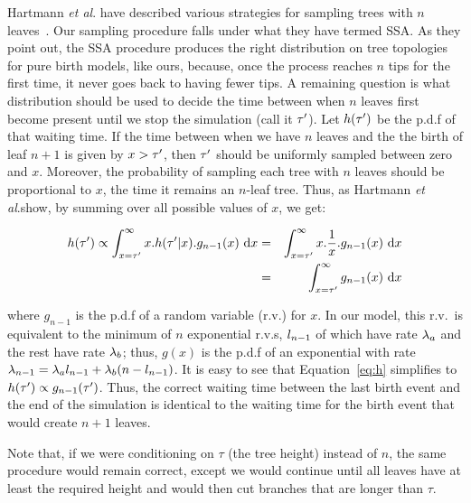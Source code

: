 Hartmann \textit{et al}. have described various strategies for sampling trees with $n$ leaves~\cite{Hartmann2010}. Our sampling procedure falls under what they have termed \gls{SSA}. As they point out, the \gls{SSA} procedure produces the right distribution on tree topologies for pure birth models, like ours, because, once the process reaches $n$ tips for the first time, it never goes back to having fewer tips. A remaining question is what distribution should be used to decide the time between when $n$ leaves first become present until we stop the simulation (call it $\tau'$). Let $h(\tau')$ be the p.d.f of that waiting time. If the time between when we have $n$ leaves and the the birth of leaf $n+1$ is given by $x>\tau'$, then $\tau'$ should be uniformly sampled between zero and $x$. Moreover, the probability of sampling each tree with $n$ leaves should be proportional to $x$, the time it remains an $n$-leaf tree. Thus, as Hartmann \textit{et al}.show, by summing over all possible values of $x$, we get:
\begin{small}
\begin{eqnarray}\label{eq:h}
h(\tav) \propto \int_{x=\tav}^{\infty} x.h(\tav|x).g_{n-1}(x) \ \mathrm{d}x &=& \int_{x=\tav}^{\infty} x.\frac{1}{x}.g_{n-1}(x) \ \mathrm{d}x  \nonumber \\ 
&=& \int_{x=\tav}^{\infty} g_{n-1}(x) \ \mathrm{d}x
\end{eqnarray}
\end{small}
where $g_{n-1}$ is the p.d.f of a random variable (r.v.) for $x$. In our model, this r.v.\ is equivalent to the minimum of $n$ exponential r.v.s, $l_{n-1}$ of which have rate $\lambda_a$ and the rest have rate $\lambda_b$; thus, $g(x)$ is the p.d.f of an exponential with rate $\lambda_{n-1}=\lambda_a l_{n-1}+\lambda_b(n-l_{n-1})$. It is easy to see that Equation~\ref{eq:h} simplifies to $h(\tau')\propto g_{n-1}(\tau')$. Thus, the correct waiting time between the last birth event and the end of the simulation is identical to the waiting time for the birth event that would create $n+1$ leaves.

Note that, if we were conditioning on $\tau$ (the tree height) instead of $n$, the same procedure would remain correct, except we would continue until all leaves have at least the required height and would then cut branches that are longer than $\tau$.

